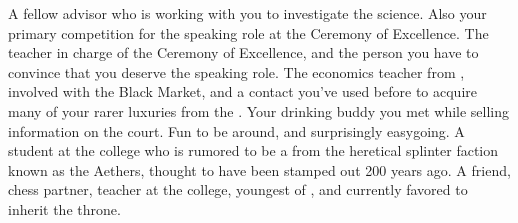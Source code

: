 \documentclass[char]{GL2020}
\begin{document}
\begin{contacts}
	\contact{\cCurse{}} A fellow \pFarm{} advisor who is working with you to investigate the \pTech{} science. Also your primary competition for the speaking role at the Ceremony of Excellence. 
	\contact{\cMusic{}} The teacher in charge of the Ceremony of Excellence, and the person you have to convince that you deserve the speaking role.
	\contact{\cChupSecond{}} The economics teacher from \pShip{}, involved with the Black Market, and a contact you've used before to acquire many of your rarer luxuries from the \pTech{}.
	\contact{\cWildCard{}} Your drinking buddy you met while selling information on the court. Fun to be around, and surprisingly easygoing.
	\contact{\cDisney{}} A student at the college who is rumored to be a \cDisney{\cleric} from the heretical splinter faction known as the Aethers, thought to have been stamped out 200 years ago.
	\contact{\cPrince{}} A friend, chess partner, teacher at the college, youngest \cPrince{\child} of \cQueen{\Majesty} \cQueen{}, and currently favored to inherit the throne.
\end{contacts}
\end{document}
